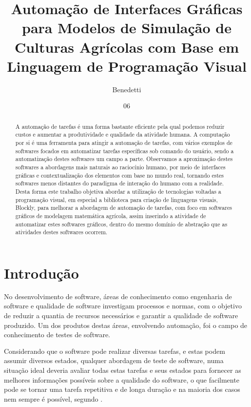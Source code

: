 \documentclass[tg]{mdtufsm}
\title{Automação de Interfaces Gráficas para Modelos de Simulação de Culturas Agrícolas com Base em Linguagem de Programação Visual}
\author{Benedetti}{Romulo Pulcinelli}
\institute{Centro de Tecnologia}
\date{06}{Julho}{2016}
\begin{document}
    \maketitle
    \makeapprove

    \begin{abstract}
        A automação de tarefas é uma forma bastante eficiente pela qual podemos reduzir custos e aumentar a produtividade e qualidade da atividade humana. A computação por si é uma ferramenta para atingir a automação de tarefas, com vários exemplos de softwares focados em automatizar tarefas específicas sob comando do usuário, sendo a automatização destes softwares um campo a parte. Observamos a aproximação destes softwares a abordagens mais naturais ao raciocínio humano, por meio de interfaces gráficas e contextualização dos elementos com base no mundo real, tornando estes softwares menos distantes do paradigma de interação do humano com a realidade. Desta forma este trabalho objetiva abordar a utilização de tecnologias voltadas a programação visual, em especial a biblioteca para criação de linguagens visuais, Blockly, para melhorar a abordagem de automação de tarefas, com foco em softwares gráficos de modelagem matemática agrícola, assim inserindo a atividade de automatizar estes softwares gráficos, dentro do mesmo domínio de abstração que as atividades destes softwares ocorrem.
    \end{abstract}

    \tableofcontents

    \setlength{\baselineskip}{1.5\baselineskip}

    \chapter{Introdução}

    	No desenvolvimento de software, áreas de conhecimento como engenharia de software e qualidade de software investigam processos e normas, com o objetivo de reduzir a quantia de recursos necessários e garantir a qualidade de software produzido. Um dos produtos destas áreas, envolvendo automação, foi o campo de conhecimento de testes de software.

        Considerando que o software pode realizar diversas tarefas, e estas podem assumir diversos estados, qualquer abordagem de teste de software, numa situação ideal deveria avaliar todas estas tarefas e seus estados para fornecer as melhores informações possíveis sobre a qualidade do software, o que facilmente pode se tornar uma tarefa repetitiva e de longa duração e na maioria dos casos nem sempre é possível, segundo \cite[pag. 10]{myers2011art}.
\end{document}
